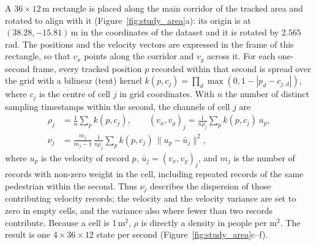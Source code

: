 \documentclass[english, 12pt, a4paper, elec, utf8, a-2b, online]{aaltothesis}
\begin{document}
A $36 \times 12$\,m rectangle is placed along the main corridor of the tracked
area and rotated to align with it (Figure~\ref{fig:study_area}a): its origin is
at $(38.28, -15.81)$\,m in the coordinates of the dataset and it is rotated by
$2.565$\,rad. The positions and the velocity vectors are expressed in the
frame of this rectangle, so that $v_x$
points along the corridor and $v_y$ across it. For each one-second frame, every
tracked position $p$ recorded within that second is spread over the grid with a
bilinear (tent) kernel $k(p, c_j) = \prod_{d} \max(0, 1 - |p_d - c_{j,d}|)$,
where $c_j$ is the centre of cell $j$ in grid coordinates. With $n$ the number
of distinct sampling timestamps within the second, the channels of cell $j$ are
\begin{equation}
	\begin{aligned}
	\rho_j &= \frac{1}{n} \sum_{p} k(p, c_j), \qquad
	(v_x, v_y)_j = \frac{1}{n \rho_j} \sum_{p} k(p, c_j)\, u_p, \\
	\nu_j &= \frac{m_j}{m_j - 1}\,\frac{1}{n \rho_j} \sum_{p} k(p, c_j)\, \|u_p - \bar{u}_j\|^2,
	\end{aligned}
	\label{eq:gridding}
\end{equation}
where $u_p$ is the velocity of record $p$, $\bar{u}_j = (v_x, v_y)_j$, and
$m_j$ is the number of records with non-zero weight in the cell, including
repeated records of the same pedestrian within the second. Thus $\nu_j$
describes the dispersion of those contributing velocity records; the velocity
and the velocity variance are set to zero in empty cells, and the variance also
where fewer than two records contribute. Because a cell is 1\,m$^2$, $\rho$ is
directly a density in people per m$^2$. The result is one $4 \times 36 \times
12$ state per second (Figure~\ref{fig:study_area}c--f).
\end{document}
